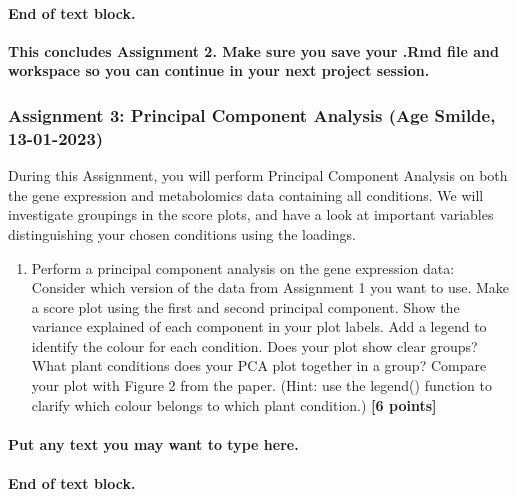 \documentclass[
]{article}
\providecommand{\tightlist}{%
  \setlength{\itemsep}{0pt}\setlength{\parskip}{0pt}}
\begin{document}
\hypertarget{end-of-text-block.-14}{%
\paragraph{\texorpdfstring{End of text block.\\
}{End of text block. }}\label{end-of-text-block.-14}}

\hfill\break
\textbf{This concludes Assignment 2. Make sure you save your .Rmd file
and workspace so you can continue in your next project session.}

\hypertarget{assignment-3-principal-component-analysis-age-smilde-13-01-2023}{%
\subsubsection{Assignment 3: Principal Component Analysis (Age Smilde,
13-01-2023)}\label{assignment-3-principal-component-analysis-age-smilde-13-01-2023}}

During this Assignment, you will perform Principal Component Analysis on
both the gene expression and metabolomics data containing all
conditions. We will investigate groupings in the score plots, and have a
look at important variables distinguishing your chosen conditions using
the loadings.

\begin{enumerate}
\def\labelenumi{\Alph{enumi})}
\tightlist
\item
  Perform a principal component analysis on the gene expression data:
  Consider which version of the data from Assignment 1 you want to use.
  Make a score plot using the first and second principal component. Show
  the variance explained of each component in your plot labels. Add a
  legend to identify the colour for each condition. Does your plot show
  clear groups? What plant conditions does your PCA plot together in a
  group? Compare your plot with Figure 2 from the paper. (Hint: use the
  legend() function to clarify which colour belongs to which plant
  condition.) \textbf{{[}6 points{]}}
\end{enumerate}

\hypertarget{put-any-text-you-may-want-to-type-here.-13}{%
\paragraph{Put any text you may want to type
here.}\label{put-any-text-you-may-want-to-type-here.-13}}

\hypertarget{end-of-text-block.-15}{%
\paragraph{End of text block.}\label{end-of-text-block.-15}}
\end{document}
